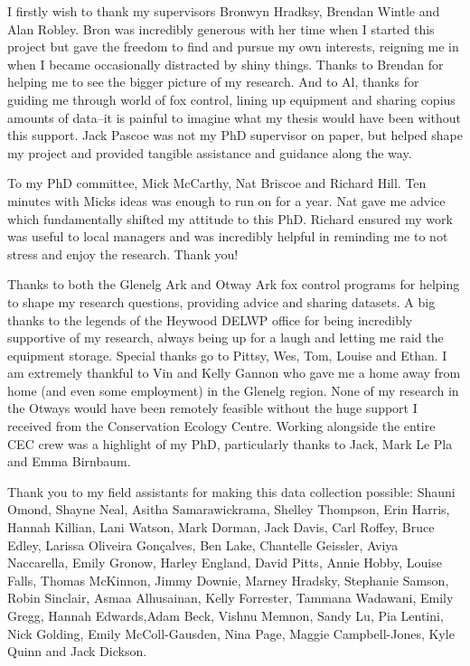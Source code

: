 \documentclass[11pt,a4paper,titlepage,twoside,openright]{style/unimelbthesis}
\begin{document}
\begin{frontmatter}
\begin{acknowledgements}
    I firstly wish to thank my supervisors Bronwyn Hradksy, Brendan Wintle and Alan Robley. Bron was incredibly generous with her time when I started this project but gave the freedom to find and pursue my own interests, reigning me in when I became occasionally distracted by shiny things. Thanks to Brendan for helping me to see the bigger picture of my research. And to Al, thanks for guiding me through world of fox control, lining up equipment and sharing copius amounts of data--it is painful to imagine what my thesis would have been without this support. Jack Pascoe was not my PhD supervisor on paper, but helped shape my project and provided tangible assistance and guidance along the way.
    
    To my PhD committee, Mick McCarthy, Nat Briscoe and Richard Hill. Ten minutes with Micks ideas was enough to run on for a year. Nat gave me advice which fundamentally shifted my attitude to this PhD. Richard ensured my work was useful to local managers and was incredibly helpful in reminding me to not stress and enjoy the research. Thank you!
    
    Thanks to both the Glenelg Ark and Otway Ark fox control programs for helping to shape my research questions, providing advice and sharing datasets. A big thanks to the legends of the Heywood DELWP office for being incredibly supportive of my research, always being up for a laugh and letting me raid the equipment storage. Special thanks go to Pittsy, Wes, Tom, Louise and Ethan. I am extremely thankful to Vin and Kelly Gannon who gave me a home away from home (and even some employment) in the Glenelg region. None of my research in the Otways would have been remotely feasible without the huge support I received from the Conservation Ecology Centre. Working alongside the entire CEC crew was a highlight of my PhD, particularly thanks to Jack, Mark Le Pla and Emma Birnbaum.
    
    Thank you to my field assistants for making this data collection possible: Shauni Omond, Shayne Neal, Asitha Samarawickrama, Shelley Thompson, Erin Harris, Hannah Killian, Lani Watson, Mark Dorman, Jack Davis, Carl Roffey, Bruce Edley, Larissa Oliveira Gonçalves, Ben Lake, Chantelle Geissler, Aviya Naccarella, Emily Gronow, Harley England, David Pitts, Annie Hobby, Louise Falls, Thomas McKinnon, Jimmy Downie, Marney Hradsky, Stephanie Samson, Robin Sinclair, Asmaa Alhusainan, Kelly Forrester, Tammana Wadawani, Emily Gregg, Hannah Edwards,Adam Beck, Vishnu Memnon, Sandy Lu, Pia Lentini, Nick Golding, Emily McColl-Gausden, Nina Page, Maggie Campbell-Jones, Kyle Quinn and Jack Dickson.
    

\end{acknowledgements}
\end{frontmatter}
\end{document}
